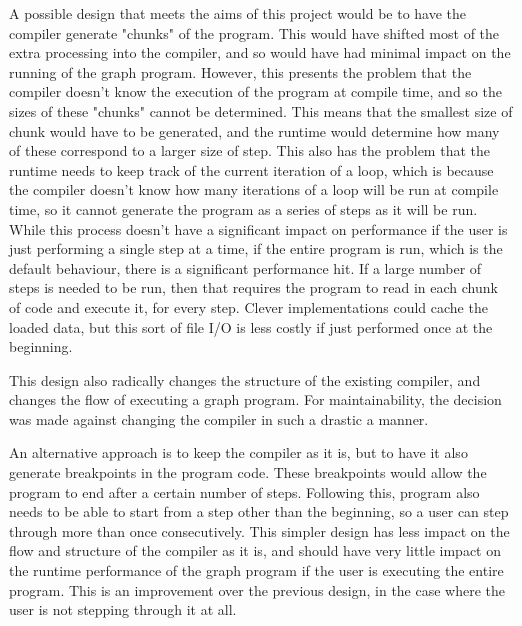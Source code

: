 \documentclass{UoYCSproject}
\begin{document}
A possible design that meets the aims of this project would be to have the compiler generate "chunks" of the program. This would have shifted most of the extra processing into the compiler, and so would have had minimal impact on the running of the graph program. %
However, this presents the problem that the compiler doesn't know the execution of the program at compile time, and so the sizes of these "chunks" cannot be determined. This means that the smallest size of chunk would have to be generated, and the runtime would determine how many of these correspond to a larger size of step. This also has the problem that the runtime needs to keep track of the current iteration of a loop, which is because the compiler doesn't know how many iterations of a loop will be run at compile time, so it cannot generate the program as a series of steps as it will be run. While this process doesn't have a significant impact on performance if the user is just performing a single step at a time, if the entire program is run, which is the default behaviour, there is a significant performance hit. If a large number of steps is needed to be run, then that requires the program to read in each chunk of code and execute it, for every step. Clever implementations could cache the loaded data, but this sort of file I/O is less costly if just performed once at the beginning.

This design also radically changes the structure of the existing compiler, and changes the flow of executing a graph program. For maintainability, the decision was made against changing the compiler in such a drastic a manner.

An alternative approach is to keep the compiler as it is, but to have it also generate breakpoints in the program code. These breakpoints would allow the program to end after a certain number of steps. Following this, program also needs to be able to start from a step other than the beginning, so a user can step through more than once consecutively. This simpler design has less impact on the flow and structure of the compiler as it is, and should have very little impact on the runtime performance of the graph program if the user is executing the entire program. This is an improvement over the previous design, in the case where the user is not stepping through it at all.
\end{document}
